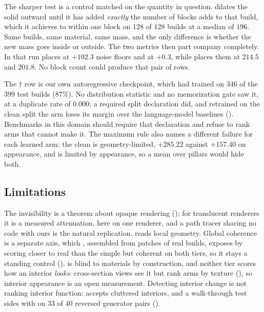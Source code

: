 The sharper test is a control matched on the quantity in question. \growshell{} dilates the
solid outward until it has added \emph{exactly} the number of blocks \solidify{} adds to
that build, which it achieves to within one block on $128$ of $128$ builds at a median of
$196$. Same builds, same material, same mass, and the only difference is whether the new
mass goes inside or outside. The two metrics then part company completely. In that run
\mvkid{} places \growshell{} at $\mathbf{+102.3}$ noise floors and \solidify{} at
$\mathbf{+0.3}$, while \vkid{} places them at $214.5$ and $201.8$. No block count could
produce that pair of rows.

The $\dagger$ row is our own autoregressive checkpoint, which had trained on $346$ of the
$399$ test builds ($87\%$). No distribution statistic and no memorization gate saw it, at a
duplicate rate of $0.000$; a required split declaration did, and retrained on the clean
split the arm loses its margin over the language-model baselines ().
Benchmarks in this domain should require that declaration and refuse to rank arms that
cannot make it. The maximum rule also names a different failure for each learned arm: the
clean \voxar{} is geometry-limited, $+285.22$ against $+157.40$ on appearance, and
\patchstitch{} is limited by appearance, so a mean over pillars would hide both.

\subsection{Limitations}
\label{sec:limitations}

The invisibility is a theorem about opaque rendering (); for translucent
renderers it is a measured attenuation, here on one renderer, and a path tracer sharing no
code with ours is the natural replication. \vkid{} reads local geometry. Global coherence is
a separate axis, which \patchstitch{}, assembled from patches of real builds, exposes by
scoring closer to real than the simple but coherent \gabled{} on both tiers, so it stays a
standing control (). \vkid{} is blind to materials by construction,
and neither tier scores how an interior \emph{looks}: cross-section views see it but rank
arms by texture (), so interior appearance is an open measurement.
Detecting interior change is not ranking interior function: \vkid{} accepts cluttered
interiors, and a walk-through test sides with \mvkid{} on $33$ of $40$ reversed generator pairs ().

